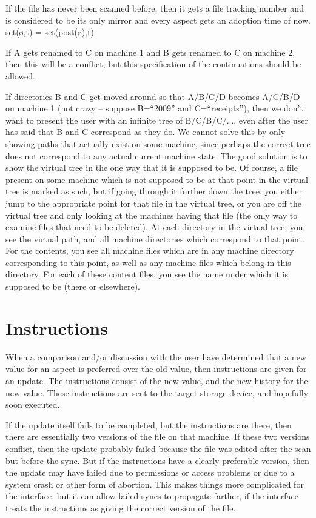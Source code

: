 \documentclass{book}
\begin{document}
If the file has never been scanned before, then it gets a file tracking number and is considered to be its only mirror and every aspect gets an adoption time of now.  set(ø,t) = set(post(ø),t)

If A gets renamed to C on machine 1 and B gets renamed to C on machine 2, then this will be a conflict, but this specification of the continuations should be allowed.

If directories B and C get moved around so that A/B/C/D becomes A/C/B/D on machine 1 (not crazy -- suppose B=``2009'' and C=``receipts''), then we don't want to present the user with an infinite tree of B/C/B/C/..., even after the user has said that B and C correspond as they do.  We cannot solve this by only showing paths that actually exist on some machine, since perhaps the correct tree does not correspond to any actual current machine state.  The good solution is to show the virtual tree in the one way that it is supposed to be.  Of course, a file present on some machine which is not supposed to be at that point in the virtual tree is marked as such, but if going through it further down the tree, you either jump to the appropriate point for that file in the virtual tree, or you are off the virtual tree and only looking at the machines having that file (the only way to examine files that need to be deleted).  At each directory in the virtual tree, you see the virtual path, and all machine directories which correspond to that point.  For the contents, you see all machine files which are in any machine directory corresponding to this point, as well as any machine files which belong in this directory.  For each of these content files, you see the name under which it is supposed to be (there or elsewhere).


\section{Instructions}

When a comparison and/or discussion with the user have determined that a new value for an aspect is preferred over the old value, then instructions are given for an update.  The instructions consist of the new value, and the new history for the new value.  These instructions are sent to the target storage device, and hopefully soon executed.

If the update itself fails to be completed, but the instructions are there, then there are essentially two versions of the file on that machine.  If these two versions conflict, then the update probably failed because the file was edited after the scan but before the sync.  But if the instructions have a clearly preferable version, then the update may have failed due to permissions or access problems or due to a system crash or other form of abortion.  This makes things more complicated for the interface, but it can allow failed syncs to propagate farther, if the interface treats the instructions as giving the correct version of the file.
\end{document}
